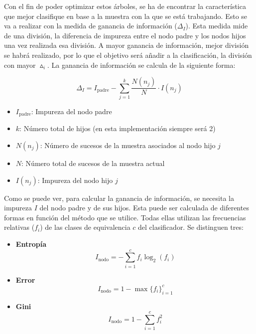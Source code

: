 \documentclass[12pt]{report}\usepackage[]{graphicx}\usepackage[dvipsnames]{xcolor}
\begin{document}
\begin{enumerate}[label = \textbf{\arabic*.}]
	 				Con el fin de poder optimizar estos árboles, se ha de encontrar la característica que mejor clasifique en base a la muestra con la que se está trabajando. Esto se va a realizar con la medida de ganancia de información ($\Delta_I$). Esta medida mide de una división, la diferencia de impureza entre el nodo padre y los nodos hijos una vez realizada esa división. A mayor ganancia de información, mejor división se habrá realizado, por lo que el objetivo será añadir a la clasificación, la división con mayor $\vartriangle_i$. La ganancia de información se calcula de la siguiente forma:
	 				
	 				$$
	 				\Delta_I = I_{\text{padre}} - \sum_{j=1}^k \frac{N(n_j)}{N} \cdot I(n_j)
 					$$
	 				
	 				\begin{itemize}
	 					\item $I_{\text{padre}}$: Impureza del nodo padre
	 					\item $k$: Número total de hijos (en esta implementación siempre será 2)
	 					\item $N(n_j)$: Número de sucesos de la muestra asociados al nodo hijo $j$
	 					\item $N$: Número total de sucesos de la muestra actual
	 					\item $I(n_j)$: Impureza del nodo hijo $j$
	 				\end{itemize}
	 				
	 				Como se puede ver, para calcular la ganancia de información, se necesita la impureza $I$ del nodo padre y de sus hijos. Esta puede ser calculada de diferentes formas en función del método que se utilice. Todas ellas utilizan las frecuencias relativas ($f_i$) de las clases de equivalencia $c$ del clasificador. Se distinguen tres:
	 				
	 				\begin{itemize}
	 					\item \textbf{Entropía}
 						$$
 						I_{\text{nodo}} = - \sum_{i=1}^{c} f_i \log_2(f_i)
 						$$
	 					
	 					\item \textbf{Error}
 						$$
 						I_{\text{nodo}} = 1 - \max\{f_i\}_{i=1}^c
 						$$
	 					
	 					\item \textbf{Gini}
 						$$
 						I_{\text{nodo}} = 1 - \sum_{i=1}^{c} f_i^2
 						$$
	 				\end{itemize}
	 				

\end{enumerate}
\end{document}
